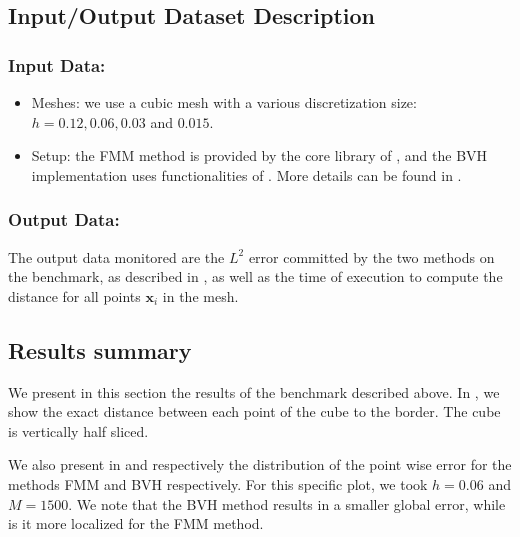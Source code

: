 

\subsection{Input/Output Dataset Description}


\subsubsection{Input Data:}
  \begin{itemize}
  \item Meshes: we use a cubic mesh with a various discretization size: $h = 0.12, 0.06, 0.03$ and $0.015$.
  \item Setup: the FMM method is provided by the core library of \Feelpp, and the BVH implementation uses functionalities of \Feelpp.
    More details can be found in \cite{van_landeghem_micro-swimming_2025}.
  \end{itemize}


\subsubsection{Output Data:}

The output data monitored are the $L^2$ error committed by the two methods on the benchmark, as described in ,
as well as the time of execution to compute the distance for all points $\mathbf{x}_i$ in the mesh.



\subsection{Results summary}

We present in this section the results of the benchmark described above.
In , we show the exact distance between each point of the cube to the border.
The cube is vertically half sliced.

We also present in  and  respectively the distribution of the point wise error for the methods FMM and BVH respectively.
For this specific plot, we took $h=0.06$ and $M=1500$.
We note that the BVH method results in a smaller global error, while is it more localized for the FMM method.


